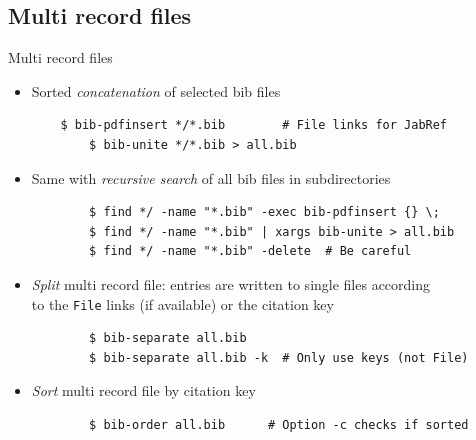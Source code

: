 \documentclass[xcolor={table,dvipsnames}]{beamer}
\renewcommand{\emph}[1]{\textit{\color{orange!90!brown}#1}}
\begin{document}
\subsection{Multi record files}
\begin{frame}[fragile]{Multi record files}
  \begin{itemize}

    \item Sorted \emph{concatenation} of selected bib files
      \begin{lstlisting}
	$ bib-pdfinsert */*.bib        # File links for JabRef
        $ bib-unite */*.bib > all.bib
      \end{lstlisting}

    \item Same with \emph{recursive search} of all bib files in subdirectories
      \begin{lstlisting}
        $ find */ -name "*.bib" -exec bib-pdfinsert {} \;
        $ find */ -name "*.bib" | xargs bib-unite > all.bib
        $ find */ -name "*.bib" -delete  # Be careful
      \end{lstlisting}


    \item \emph{Split} multi record file: entries are written
      to single files according\\
      to the \verb!File! links (if available) or the citation key
      \begin{lstlisting}
        $ bib-separate all.bib
        $ bib-separate all.bib -k  # Only use keys (not File)
      \end{lstlisting}

    \item \emph{Sort} multi record file by citation key
      \begin{lstlisting}
        $ bib-order all.bib      # Option -c checks if sorted
      \end{lstlisting}

  \end{itemize}
\end{frame}
\end{document}
